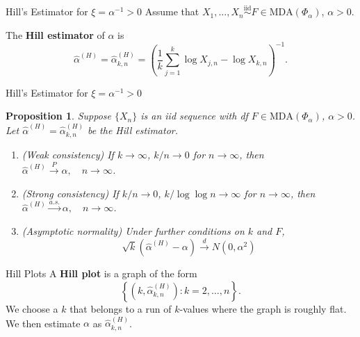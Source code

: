 \documentclass{beamer}
\newcommand{\MDA}{\text{MDA}}
\newtheorem{proposition}{Proposition}
\begin{document}
\begin{frame}{Hill's Estimator for $\xi = \alpha^{-1} > 0$}
    Assume that $X_1, \ldots, X_n \overset{\text{iid}}{\sim} F \in \MDA(\Phi_{\alpha})$, $\alpha > 0$.

    \medskip

    The \textbf{Hill estimator} of $\alpha$ is
    \[
    \hat{\alpha}^{(H)} = \hat{\alpha}_{k, n}^{(H)} = \left(\frac{1}{k}\sum_{j = 1}^k \log X_{j, n} - \log X_{k, n}\right)^{-1}.
    \]
\end{frame}

\begin{frame}{Hill's Estimator for $\xi = \alpha^{-1} > 0$}
    \begin{proposition}
        Suppose $\{X_n\}$ is an iid sequence with df $F \in \MDA(\Phi_{\alpha})$, $\alpha > 0$. Let $\hat{\alpha}^{(H)} = \hat{\alpha}_{k, n}^{(H)}$ be the Hill estimator.
        \begin{enumerate}
            \item[(a)] (Weak consistency) If $k \to \infty$, $k / n \to 0$ for $n \to \infty$, then $\hat{\alpha}^{(H)} \xrightarrow{P} \alpha, \quad n \to \infty$.
            \item[(b)] (Strong consistency) If $k / n \to 0$, $k / \log\log n \to \infty$ for $n \to \infty$, then 
            $\hat{\alpha}^{(H)} \xrightarrow{a.s.} \alpha, \quad n \to \infty$.
            \item[(c)] (Asymptotic normality) Under further conditions on $k$ and $F$,
            \[
            \sqrt{k}(\hat{\alpha}^{(H)} - \alpha) \xrightarrow{d} N(0, \alpha^2)
            \]
        \end{enumerate}
    \end{proposition}    
\end{frame}

\begin{frame}{Hill Plots}
    A \textbf{Hill plot} is a graph of the form
    \[
    \left\{\left(k, \hat{\alpha}_{k, n}^{(H)}\right) : k = 2, \ldots, n\right\}.
    \]
    We choose a $k$ that belongs to a run of $k$-values where the graph is roughly flat. We then estimate $\alpha$ as $\hat{\alpha}_{k, n}^{(H)}$.
\end{frame}
\end{document}
